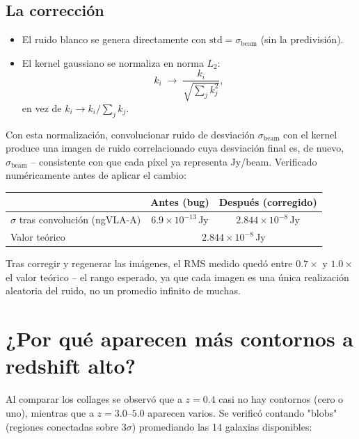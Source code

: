 \documentclass[12pt, a4paper]{article}
\begin{document}
\subsection{La corrección}

\begin{itemize}
    \item El ruido blanco se genera directamente con
          $\mathrm{std} = \sigma_{\mathrm{beam}}$ (sin la predivisión).
    \item El kernel gaussiano se normaliza en norma $L_2$:
          \begin{equation}
              k_i \;\longrightarrow\; \frac{k_i}{\sqrt{\sum_j k_j^2}},
              \label{eq:kernel_l2}
          \end{equation}
          en vez de $k_i \to k_i / \sum_j k_j$.
\end{itemize}

Con esta normalización, convolucionar ruido de desviación
$\sigma_{\mathrm{beam}}$ con el kernel produce una imagen de ruido
correlacionado cuya desviación final es, de nuevo, $\sigma_{\mathrm{beam}}$
-- consistente con que cada píxel ya representa Jy/beam. Verificado
numéricamente antes de aplicar el cambio:

\begin{center}
\begin{tabular}{lcc}
\toprule
& \textbf{Antes (bug)} & \textbf{Después (corregido)} \\
\midrule
$\sigma$ tras convolución (ngVLA-A) & $6.9\times10^{-13}$\,Jy & $2.844\times10^{-8}$\,Jy \\
Valor teórico & \multicolumn{2}{c}{$2.844\times10^{-8}$\,Jy} \\
\bottomrule
\end{tabular}
\end{center}

Tras corregir y regenerar las imágenes, el RMS medido quedó entre
$0.7\times$ y $1.0\times$ el valor teórico -- el rango esperado, ya que cada
imagen es una única realización aleatoria del ruido, no un promedio
infinito de muchas.

\section{¿Por qué aparecen más contornos a redshift alto?}

Al comparar los collages se observó que a $z=0.4$ casi no hay contornos
(cero o uno), mientras que a $z=3.0$--$5.0$ aparecen varios. Se verificó
contando "blobs" (regiones conectadas sobre $3\sigma$) promediando las 14
galaxias disponibles:
\end{document}
